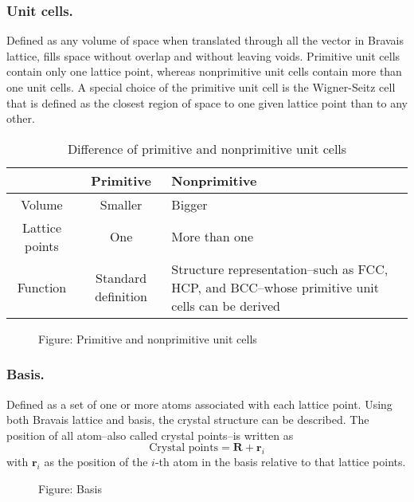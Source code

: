 \documentclass[../../../main.tex]{subfiles}
\begin{document}
\subsubsection{Unit cells.}
Defined as any volume of space when translated through all the vector in Bravais lattice, fills space without overlap and without leaving voids.
Primitive unit cells contain only one lattice point, whereas nonprimitive unit cells contain more than  one unit cells.
A special choice of the primitive unit cell is the
Wigner-Seitz cell that is defined as the closest region of space to one given lattice point than to any other.
\begin{table}[h]
    \centering
    \caption{Difference of primitive and nonprimitive unit cells}
    \begin{tabular}{ cc>{\centering\arraybackslash}p{2cm}} 
        \toprule
        &Primitive&Nonprimitive\\
        \midrule
        Volume&Smaller&Bigger\\
        Lattice points&One&More than one\\
        Function&Standard definition&Structure representation--such as FCC, HCP, and BCC--whose primitive unit cells can be derived\\
        \bottomrule
    \end{tabular}
\end{table}
\begin{figure*}[]
    \centering
    \caption*{Figure: Primitive and nonprimitive unit cells}
\end{figure*}

\subsubsection*{Basis.}
Defined as a set of one or more atoms associated with each lattice point.
Using both Bravais lattice and basis, the crystal structure can be described.
The position of all atom--also called crystal points--is written as 
\begin{equation*}
    \text{Crystal points}=\mathbf{R}+\mathbf{r}_i
\end{equation*}
with $\mathbf{r}_i$ as the position of the $i$-th atom in the basis relative to that lattice points.
\begin{figure*}[h]
    \centering
    \caption*{Figure: Basis}
\end{figure*}
\end{document}
